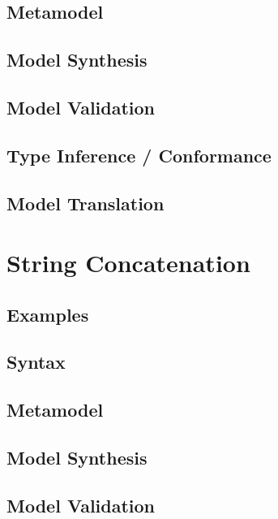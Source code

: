\documentclass[a4paper,oneside,12pt, extrafontsizes]{memoir}
\begin{document}
    \section{Metamodel}

    \section{Model Synthesis}

    \section{Model Validation}

    \section{Type Inference / Conformance}

    \section{Model Translation}

  \chapter{String Concatenation}
  \label{ch:string-concatenation}
  

    \section{Examples}
    

    \section{Syntax}

    \section{Metamodel}

    \section{Model Synthesis}

    \section{Model Validation}
    
\end{document}
